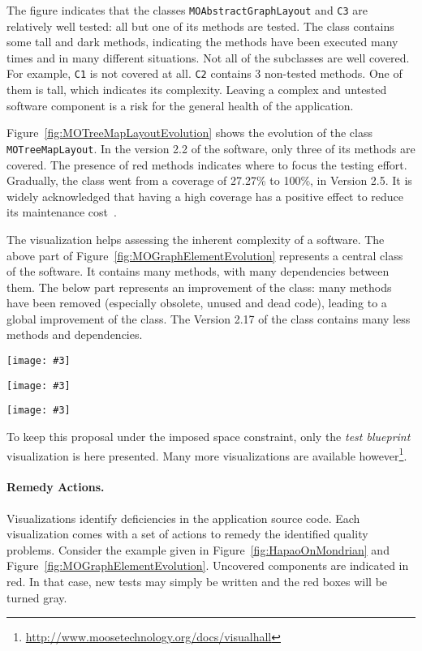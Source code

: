 \documentclass[runningheads]{llncs}
\newcommand{\ct}{\lstinline[backgroundcolor=\color{white},basicstyle=\footnotesize\ttfamily]}
\newcommand{\figLarge}[4]{
	\begin{figure*}[#1]
		\centering
		\texttt{[image: \#3]}
		\caption{\label{fig:#3}#4}
	\end{figure*}}
\newcommand{\figref}[1]{Figure~\ref{fig:#1}}
\begin{document}
The figure indicates that the classes \texttt{MOAbstractGraph\-Layout} and \ct{C3} are relatively well tested: all but one of its methods are tested. The class contains some tall and dark methods, indicating the methods have been executed many times and in many different situations. Not all of the subclasses are well covered. For example, \ct{C1} is not covered at all. \ct{C2} contains 3 non-tested methods. One of them is tall, which indicates its complexity. Leaving a complex and untested software component is a risk for the general health of the application.

\figref{MOTreeMapLayoutEvolution} shows the evolution of the class \ct{MOTreeMapLayout}. In the version 2.2 of the software, only three of its methods are covered. The presence of red methods indicates where to focus the testing effort. Gradually, the class went from a coverage of 27.27\% to 100\%, in Version 2.5. It is widely acknowledged that having a high coverage has a positive effect to reduce its maintenance cost~\cite{Mock09a,Piwo93a}.

The visualization helps assessing the inherent complexity of a software. The above part of \figref{MOGraphElementEvolution} represents a central class of the software. It contains many methods, with many dependencies between them. The below part represents an improvement of the class: many methods have been removed (especially obsolete, unused and dead code), leading to a global improvement of the class. The Version 2.17 of the class contains many less methods and dependencies.

\figLarge{}{0.8}{HapaoOnMondrian}{Example of test coverage visualization}
\figLarge{}{0.7}{MOTreeMapLayoutEvolution}{Test coverage evolution}
\figLarge{}{0.9}{MOGraphElementEvolution}{Complexity reduction}

To keep this proposal under the imposed space constraint, only the \emph{test blueprint} visualization is here presented. Many more visualizations are available however\footnote{\url{http://www.moosetechnology.org/docs/visualhall}}.

\paragraph{Remedy Actions.}
Visualizations identify deficiencies in the application source code. Each visualization comes with a set of actions to remedy the identified quality problems. 
Consider the example given in \figref{HapaoOnMondrian} and \figref{MOGraphElementEvolution}.
Uncovered components are indicated in red. In that case, new tests may simply be written and the red boxes will be turned gray. 
\end{document}
